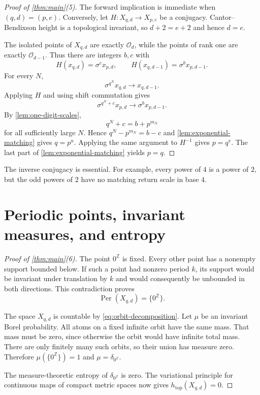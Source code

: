 \documentclass[11pt,a4paper]{amsart}
\theoremstyle{definition}
\theoremstyle{remark}
\newcommand{\Z}{\mathbb Z}
\newcommand{\cO}{\mathcal O}
\newcommand{\Per}{\operatorname{Per}}
\newcommand{\htop}{h_{\mathrm{top}}}
\newcommand{\zero}{0^{\Z}}
\begin{document}
\begin{proof}[Proof of \cref{thm:main}(5)]
The forward implication is immediate when $(q,d)=(p,e)$.  Conversely, let
$H:X_{q,d}\to X_{p,e}$ be a conjugacy.  Cantor--Bendixson height is a
topological invariant, so $d+2=e+2$ and hence $d=e$.

The isolated points of $X_{q,d}$ are exactly $\cO_d$, while the points of
rank one are exactly $\cO_{d-1}$.  Thus there are integers $b,c$ with
\[
 H(x_{q,d})=\sigma^c x_{p,d},
 \qquad
 H(x_{q,d-1})=\sigma^b x_{p,d-1}.
\]
For every $N$,
\[
 \sigma^{q^N}x_{q,d}\longrightarrow x_{q,d-1}.
\]
Applying $H$ and using shift commutation gives
\[
 \sigma^{q^N+c}x_{p,d}\longrightarrow\sigma^b x_{p,d-1}.
\]
By \cref{lem:one-digit-scales},
\[
 q^N+c=b+p^{m_N}
\]
for all sufficiently large $N$.  Hence
$q^N-p^{m_N}=b-c$ and \cref{lem:exponential-matching} gives $q=p^u$.
Applying the same argument to $H^{-1}$ gives $p=q^v$.  The last part of
\cref{lem:exponential-matching} yields $p=q$.
\end{proof}

The inverse conjugacy is essential.  For example, every power of $4$ is a
power of $2$, but the odd powers of $2$ have no matching return scale in base
$4$.

\section{Periodic points, invariant measures, and entropy}

\begin{proof}[Proof of \cref{thm:main}(6)]
The point $\zero$ is fixed.  Every other point has a nonempty support bounded
below.  If such a point had nonzero period $k$, its support would be invariant
under translation by $k$ and would consequently be unbounded in both
directions.  This contradiction proves
\[
 \Per(X_{q,d})=\{\zero\}.
\]

The space $X_{q,d}$ is countable by \eqref{eq:orbit-decomposition}.  Let
$\mu$ be an invariant Borel probability.  All atoms on a fixed infinite
orbit have the same mass.  That mass must be zero, since otherwise the orbit
would have infinite total mass.  There are only finitely many such orbits,
so their union has measure zero.  Therefore
$\mu(\{\zero\})=1$ and $\mu=\delta_{\zero}$.

The measure-theoretic entropy of $\delta_{\zero}$ is zero.  The variational
principle for continuous maps of compact metric spaces now gives
$\htop(X_{q,d})=0$.
\end{proof}
\end{document}
